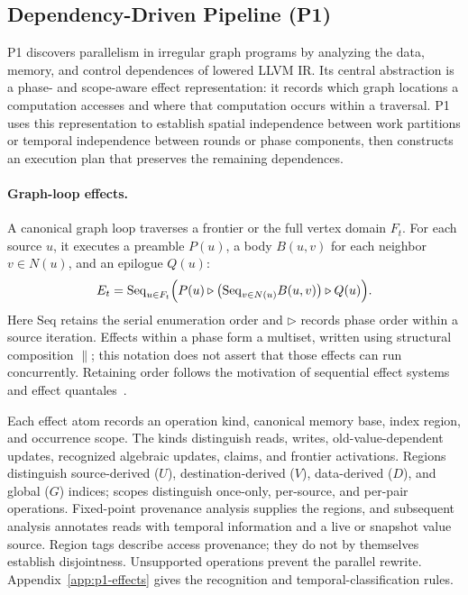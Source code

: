 
\subsection{Dependency-Driven Pipeline (P1)}
\label{sec:p1}
P1 discovers parallelism in irregular graph programs by analyzing the
data, memory, and control dependences of lowered LLVM IR. Its central
abstraction is a phase- and scope-aware effect representation: it records
which graph locations a computation accesses and where that computation
occurs within a traversal. P1 uses this representation to establish
spatial independence between work partitions or temporal independence
between rounds or phase components, then constructs an execution plan
that preserves the remaining dependences.

\paragraph{Graph-loop effects.}
A canonical graph loop traverses a frontier or the full vertex domain
$F_t$. For each source $u$, it executes a preamble $P(u)$, a body $B(u,v)$
for each neighbor $v\in N(u)$, and an epilogue $Q(u)$:
\begin{equation}
E_t = \mathrm{Seq}_{u\in F_t}\Bigl(
P(u)\triangleright
\bigl(\mathrm{Seq}_{v\in N(u)} B(u,v)\bigr)
\triangleright Q(u)\Bigr).
\label{eq:effect-expr}
\end{equation}
Here $\mathrm{Seq}$ retains the serial enumeration order and
$\triangleright$ records phase order within a source iteration. Effects
within a phase form a multiset, written using structural composition
$\parallel$; this notation does not assert that those effects can run
concurrently. Retaining order follows the motivation of sequential
effect systems~\cite{10.1145/2429069.2429074} and effect
quantales~\cite{gordon2017genericapproachflowsensitivepolymorphic,10.1145/3450272}.

Each effect atom records an operation kind, canonical memory base,
index region, and occurrence scope. The kinds distinguish reads, writes,
old-value-dependent updates, recognized algebraic updates, claims, and
frontier activations. Regions distinguish source-derived ($U$),
destination-derived ($V$), data-derived ($D$), and global ($G$) indices;
scopes distinguish once-only, per-source, and per-pair operations.
Fixed-point provenance analysis supplies the regions, and subsequent
analysis annotates reads with temporal information and a live or snapshot
value source. Region tags describe access provenance; they do not by
themselves establish disjointness. Unsupported operations prevent the
parallel rewrite. Appendix~\ref{app:p1-effects} gives the recognition and
temporal-classification rules.

